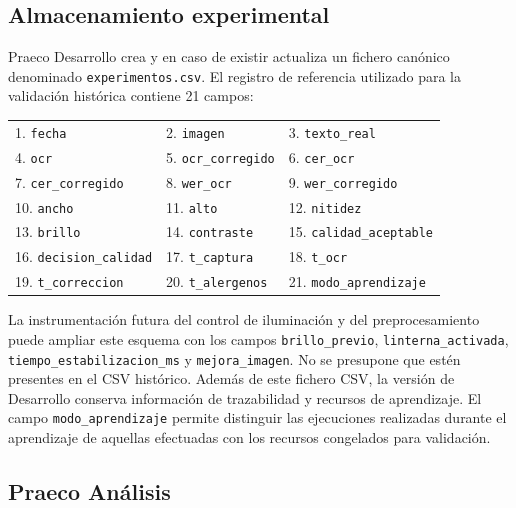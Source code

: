\subsection{Almacenamiento experimental}

Praeco Desarrollo crea y en caso de existir actualiza un fichero canónico denominado \texttt{experimentos.csv}. El registro de referencia utilizado para la validación histórica contiene 21 campos:

\begin{center}
	\renewcommand{\arraystretch}{1.3}
	\setlength{\tabcolsep}{12pt}
	\begin{tabular}{lll}
		1. \texttt{fecha}              & 2. \texttt{imagen}              & 3. \texttt{texto\_real} \\
		4. \texttt{ocr}                & 5. \texttt{ocr\_corregido}      & 6. \texttt{cer\_ocr} \\
		7. \texttt{cer\_corregido}     & 8. \texttt{wer\_ocr}            & 9. \texttt{wer\_corregido} \\
		10. \texttt{ancho}             & 11. \texttt{alto}               & 12. \texttt{nitidez} \\
		13. \texttt{brillo}            & 14. \texttt{contraste}          & 15. \texttt{calidad\_aceptable} \\
		16. \texttt{decision\_calidad} & 17. \texttt{t\_captura}         & 18. \texttt{t\_ocr} \\
		19. \texttt{t\_correccion}     & 20. \texttt{t\_alergenos}       & 21. \texttt{modo\_aprendizaje} \\
	\end{tabular}
\end{center}

La instrumentación futura del control de iluminación y del preprocesamiento puede ampliar este esquema con los campos \texttt{brillo\_previo}, \texttt{linterna\_activada}, \texttt{tiempo\_estabilizacion\_ms} y \texttt{mejora\_imagen}. No se presupone que estén presentes en el CSV histórico. Además de este fichero CSV, la versión de Desarrollo conserva información de trazabilidad y recursos de aprendizaje. El campo \texttt{modo\_aprendizaje} permite distinguir las ejecuciones realizadas durante el aprendizaje de aquellas efectuadas con los recursos congelados para validación.

\subsection{Praeco Análisis}

